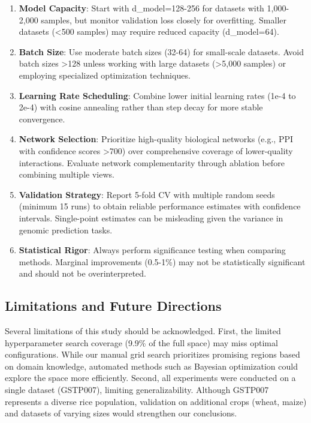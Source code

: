 \documentclass[11pt,a4paper]{article}
\begin{document}
\begin{enumerate}
    \item \textbf{Model Capacity}: Start with d\_model=128-256 for datasets with 1,000-2,000 samples, but monitor validation loss closely for overfitting. Smaller datasets (<500 samples) may require reduced capacity (d\_model=64).

    \item \textbf{Batch Size}: Use moderate batch sizes (32-64) for small-scale datasets. Avoid batch sizes >128 unless working with large datasets (>5,000 samples) or employing specialized optimization techniques.

    \item \textbf{Learning Rate Scheduling}: Combine lower initial learning rates (1e-4 to 2e-4) with cosine annealing rather than step decay for more stable convergence.

    \item \textbf{Network Selection}: Prioritize high-quality biological networks (e.g., PPI with confidence scores >700) over comprehensive coverage of lower-quality interactions. Evaluate network complementarity through ablation before combining multiple views.

    \item \textbf{Validation Strategy}: Report 5-fold CV with multiple random seeds (minimum 15 runs) to obtain reliable performance estimates with confidence intervals. Single-point estimates can be misleading given the variance in genomic prediction tasks.

    \item \textbf{Statistical Rigor}: Always perform significance testing when comparing methods. Marginal improvements (0.5-1\%) may not be statistically significant and should not be overinterpreted.
\end{enumerate}

\subsection{Limitations and Future Directions}
\label{subsec:limitations_future}

Several limitations of this study should be acknowledged. First, the limited hyperparameter search coverage (9.9\% of the full space) may miss optimal configurations. While our manual grid search prioritizes promising regions based on domain knowledge, automated methods such as Bayesian optimization could explore the space more efficiently. Second, all experiments were conducted on a single dataset (GSTP007), limiting generalizability. Although GSTP007 represents a diverse rice population, validation on additional crops (wheat, maize) and datasets of varying sizes would strengthen our conclusions.
\end{document}
